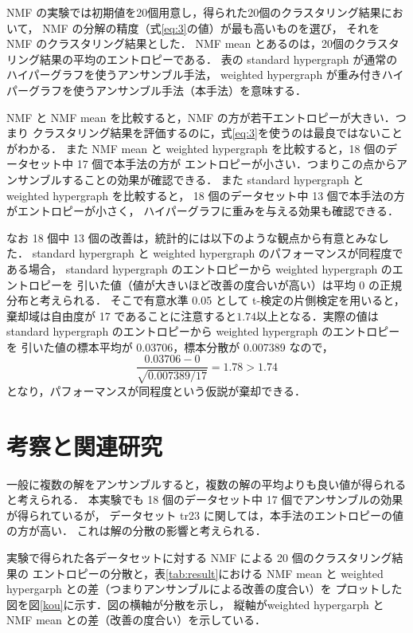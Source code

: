 \documentclass[japanese]{jnlp_1.3e}
\begin{document}
NMF の実験では初期値を20個用意し，得られた20個のクラスタリング結果において，
NMF の分解の精度（\mbox{式\ref{eq:3}}の値）が最も高いものを選び，
それを NMF のクラスタリング結果とした．
NMF mean とあるのは，20個のクラスタリング結果の平均のエントロピーである．
表の standard hypergraph が通常のハイパーグラフを使うアンサンブル手法，
weighted hypergraph が重み付きハイパーグラフを使うアンサンブル手法（本手法）を意味する．

NMF と NMF mean を比較すると，NMF の方が若干エントロピーが大きい．つまり
クラスタリング結果を評価するのに，\mbox{式\ref{eq:3}}を使うのは最良ではないことがわかる．
また NMF mean と weighted hypergraph を比較すると，18 個のデータセット中 17 個で本手法の方が
エントロピーが小さい．つまりこの点からアンサンブルすることの効果が確認できる．
また standard hypergraph と weighted hypergraph を比較すると，
18 個のデータセット中 13 個で本手法の方がエントロピーが小さく，
ハイパーグラフに重みを与える効果も確認できる．

なお 18 個中 13 個の改善は，統計的には以下のような観点から有意とみなした．
standard hypergraph と weighted hypergraph のパフォーマンスが同程度である場合，
standard hypergraph のエントロピーから weighted hypergraph のエントロピーを
引いた値（値が大きいほど改善の度合いが高い）は平均 0 の正規分布と考えられる．
そこで有意水準 0.05 として t-検定の片側検定を用いると，
棄却域は自由度が 17 であることに注意すると\( 1.74 \)以上となる．実際の値は
standard hypergraph のエントロピーから weighted hypergraph のエントロピーを
引いた値の標本平均が 0.03706，標本分散が 0.007389 なので，
\[
\frac{0.03706 - 0}{\sqrt{0.007389 / 17}} = 1.78 > 1.74
\]
\noindent
となり，パフォーマンスが同程度という仮説が棄却できる．



\section{考察と関連研究}



一般に複数の解をアンサンブルすると，複数の解の平均よりも良い値が得られると考えられる．
本実験でも 18 個のデータセット中 17 個でアンサンブルの効果が得られているが，
データセット tr23 に関しては，本手法のエントロピーの値の方が高い．
これは解の分散の影響と考えられる．

実験で得られた各データセットに対する NMF による 20 個のクラスタリング結果の
エントロピーの分散と，\mbox{表\ref{tab:result}}における
NMF mean と weighted hypergarph との差（つまりアンサンブルによる改善の度合い）を
プロットした図を\mbox{図\ref{kou}}に示す．図の横軸が分散を示し，
縦軸がweighted hypergarph と NMF mean との差（改善の度合い）を示している．
\end{document}
